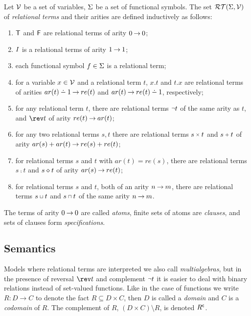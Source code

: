 \begin{definition}\label {def:rel-terms}
Let ${\cal V}$ be a set of variables, $\Sigma$ be a set of functional symbols.
The set \({\cal RT}(\Sigma,{\cal V})\) of {\em relational terms} and their arities
are defined inductively as follows:
\begin{enumerate}\smallerspaces
\item ${\sf T}$ and ${\sf F}$ are relational terms of arity \(0\mathbin{\rightarrow}0\);
\item $I$ is a relational terms of arity \(1\mathbin{\rightarrow}1\);
\item each functional symbol \(f\in \Sigma\) is a relational term;
\item for a variable \(x\in {\cal V}\) and a relational term $t$, $x.t$ and
  $t.x$ are relational terms of arities \(\type {ar(t)\dotminus 1}{re(t)}\)
  and \(\type {ar(t)}{re(t)\dotminus 1}\), respectively;
\item for any relational term \(t\), there are relational terms \(\Neg t\) of
  the same arity as $t$, and \(\rev t\) of arity \(re(t)\mathbin{\rightarrow}ar(t)\); 
\item for any two relational terms \(s,t\) there are relational terms \(s\pro
  t\) and \(s\plu t\) of arity \(ar(s)+ar(t)\mathbin{\rightarrow}re(s)+re(t)\);
\item for relational terms $s$ and $t$ with \(ar(t)= re(s)\), there are
  relational terms \(s\comp t\) and \(s\diamond t\) of arity \(ar(s)\mathbin{\rightarrow}re(t)\);
\item for relational terms $s$ and $t$, both of an arity \(n\mathbin{\rightarrow}m\),
  there are relational terms \(s\join t\) and \(s\meet t\) of the same
  arity \(n\mathbin{\rightarrow}m\).
\end{enumerate}
\end{definition}

The terms of arity \(0\mathbin{\rightarrow}0\) are called {\em atoms}, finite sets of
atoms are {\em clauses}, and sets of clauses form {\em specifications}.

\subsection{Semantics} 

Models where relational terms are interpreted we also call {\em
multialgebras}, but in the presence of reversal \(\rev t\) and complement
\(\Neg t\) it is easier to deal with binary relations instead of set-valued
functions.  Like in the case of functions we write \(R:D\to C\) to denote the
fact \(R\subseteq D\times C\), then $D$ is called a {\em domain} and $C$ is a
{\em codomain} of $R$.  The complement of $R$, \((D\times C)\setminus R\), is
denoted $R^{\sf c}$.

